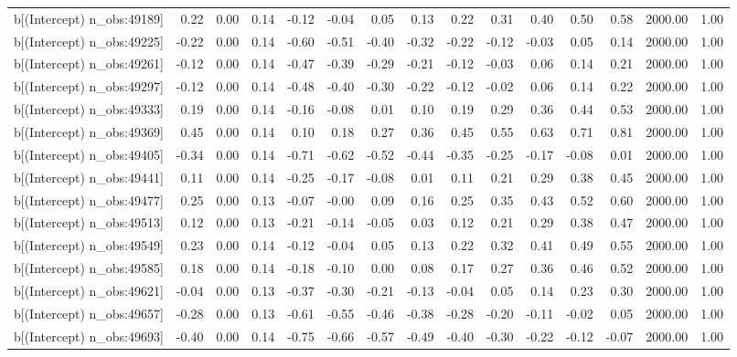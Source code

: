 \begin{table}[ht]
\begin{tabular}{rrrrrrrrrrrrrrr}
  b[(Intercept) n\_obs:49189] & 0.22 & 0.00 & 0.14 & -0.12 & -0.04 & 0.05 & 0.13 & 0.22 & 0.31 & 0.40 & 0.50 & 0.58 & 2000.00 & 1.00 \\ 
  b[(Intercept) n\_obs:49225] & -0.22 & 0.00 & 0.14 & -0.60 & -0.51 & -0.40 & -0.32 & -0.22 & -0.12 & -0.03 & 0.05 & 0.14 & 2000.00 & 1.00 \\ 
  b[(Intercept) n\_obs:49261] & -0.12 & 0.00 & 0.14 & -0.47 & -0.39 & -0.29 & -0.21 & -0.12 & -0.03 & 0.06 & 0.14 & 0.21 & 2000.00 & 1.00 \\ 
  b[(Intercept) n\_obs:49297] & -0.12 & 0.00 & 0.14 & -0.48 & -0.40 & -0.30 & -0.22 & -0.12 & -0.02 & 0.06 & 0.14 & 0.22 & 2000.00 & 1.00 \\ 
  b[(Intercept) n\_obs:49333] & 0.19 & 0.00 & 0.14 & -0.16 & -0.08 & 0.01 & 0.10 & 0.19 & 0.29 & 0.36 & 0.44 & 0.53 & 2000.00 & 1.00 \\ 
  b[(Intercept) n\_obs:49369] & 0.45 & 0.00 & 0.14 & 0.10 & 0.18 & 0.27 & 0.36 & 0.45 & 0.55 & 0.63 & 0.71 & 0.81 & 2000.00 & 1.00 \\ 
  b[(Intercept) n\_obs:49405] & -0.34 & 0.00 & 0.14 & -0.71 & -0.62 & -0.52 & -0.44 & -0.35 & -0.25 & -0.17 & -0.08 & 0.01 & 2000.00 & 1.00 \\ 
  b[(Intercept) n\_obs:49441] & 0.11 & 0.00 & 0.14 & -0.25 & -0.17 & -0.08 & 0.01 & 0.11 & 0.21 & 0.29 & 0.38 & 0.45 & 2000.00 & 1.00 \\ 
  b[(Intercept) n\_obs:49477] & 0.25 & 0.00 & 0.13 & -0.07 & -0.00 & 0.09 & 0.16 & 0.25 & 0.35 & 0.43 & 0.52 & 0.60 & 2000.00 & 1.00 \\ 
  b[(Intercept) n\_obs:49513] & 0.12 & 0.00 & 0.13 & -0.21 & -0.14 & -0.05 & 0.03 & 0.12 & 0.21 & 0.29 & 0.38 & 0.47 & 2000.00 & 1.00 \\ 
  b[(Intercept) n\_obs:49549] & 0.23 & 0.00 & 0.14 & -0.12 & -0.04 & 0.05 & 0.13 & 0.22 & 0.32 & 0.41 & 0.49 & 0.55 & 2000.00 & 1.00 \\ 
  b[(Intercept) n\_obs:49585] & 0.18 & 0.00 & 0.14 & -0.18 & -0.10 & 0.00 & 0.08 & 0.17 & 0.27 & 0.36 & 0.46 & 0.52 & 2000.00 & 1.00 \\ 
  b[(Intercept) n\_obs:49621] & -0.04 & 0.00 & 0.13 & -0.37 & -0.30 & -0.21 & -0.13 & -0.04 & 0.05 & 0.14 & 0.23 & 0.30 & 2000.00 & 1.00 \\ 
  b[(Intercept) n\_obs:49657] & -0.28 & 0.00 & 0.13 & -0.61 & -0.55 & -0.46 & -0.38 & -0.28 & -0.20 & -0.11 & -0.02 & 0.05 & 2000.00 & 1.00 \\ 
  b[(Intercept) n\_obs:49693] & -0.40 & 0.00 & 0.14 & -0.75 & -0.66 & -0.57 & -0.49 & -0.40 & -0.30 & -0.22 & -0.12 & -0.07 & 2000.00 & 1.00 \\ 

\end{tabular}
\end{table}
